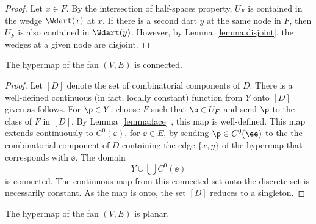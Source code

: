 \begin{proof}  Let $x\in F$.  By the intersection of half-spaces property, $U_F$ is contained in the wedge $\Wdart(x)$ at $x$.  If there is a second dart $y$ at the same node in $F$, then $U_F$ is also contained in $\Wdart(y)$. However, by Lemma~\ref{lemma:disjoint}, the wedges at a given node are disjoint.
\end{proof}

\begin{corollary}  
The hypermap of the fan $(V,E)$ is connected.
\end{corollary}
%
%
%


\begin{proof}  Let $[D]$ denote the set of combinatorial components of $D$.
There is a well-defined continuous (in fact, locally constant) function from $Y$ onto $[D]$ given as follows.  For $\p\in Y$, choose $F$ such that $\p\in U_F$ and send $\p$ to the class of $F$ in $[D]$.  By Lemma~\ref{lemma:face} , this map is well-defined. This map extends continuously to $C^0(\ee)$, for $\ee\in E$, by sending $\p\in C^0(\ee)$ to the the combinatorial component of $D$ containing the edge $\{x,y\}$ of the hypermap that corresponds with $\ee$.  The domain
$$
Y\cup \bigcup C^0(\ee)
$$
is connected.  The continuous map from this connected set onto the discrete set is necessarily constant.  As the map is onto, the set $[D]$ reduces to a singleton.
\end{proof}

\begin{corollary}  
The hypermap of the fan $(V,E)$ is planar.
\end{corollary}
%
%

